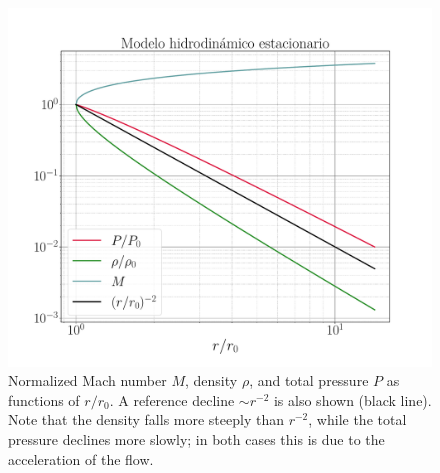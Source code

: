 \documentclass{book}
\begin{document}
\begin{figure}[htb]
    \centering    \includegraphics[width=\textwidth]{Nuevas imagenes finales/C2_estructura.pdf}
    \caption{Normalized Mach number $M$, density $\rho$, and total
      pressure $P$ as functions of $r/r_0$. A reference decline
      $\sim r^{-2}$ is also shown (black line). Note that the density
      falls more steeply than $r^{-2}$, while the total pressure
      declines more slowly; in both cases this is due to the
      acceleration of the flow.}
    \label{fig:grafica_C2}
  \end{figure}
  


\end{document}
